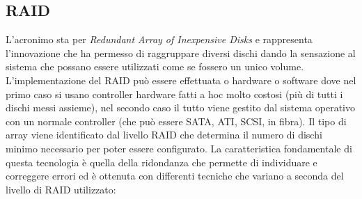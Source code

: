 \subsection{RAID}
L'acronimo sta per \textit{Redundant Array of Inexpensive Disks} e rappresenta l'innovazione che ha permesso di raggruppare diversi dischi dando la sensazione al sistema che possano essere utilizzati come se fossero un unico volume. L'implementazione del RAID può essere effettuata o hardware o software dove nel primo caso si usano controller hardware fatti a hoc molto costosi (più di tutti i dischi messi assieme), nel secondo caso il tutto viene gestito dal sistema operativo con un normale controller (che può essere SATA, ATI, SCSI, in fibra). Il tipo di array viene identificato dal livello RAID che determina il numero di dischi minimo necessario per poter essere configurato. La caratteristica fondamentale di questa tecnologia è quella della ridondanza che permette di individuare e correggere errori ed è ottenuta con differenti tecniche che variano a seconda del livello di RAID utilizzato:
